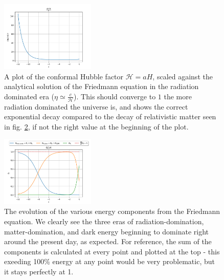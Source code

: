 \begin{figure}[h!tbp]
\centering
\includegraphics[width=0.4\textwidth]{../Milestone 1/Plots/etaHp_over_c_of_x.png}
\caption{A plot of the conformal Hubble factor $\mathcal{H} = aH$, scaled against the analytical solution of the Friedmann equation in the radiation dominated era ($\eta \simeq \frac{c}{\mathcal{H}}$). This should converge to $1$ the more radiation dominated the universe is, and shows the correct exponential decay compared to the decay of relativistic matter seen in fig. \ref{fig:milestone_1_Omega_i_of_x}, if not the right value at the beginning of the plot.}
\label{fig:milestone_1_etaHp_over_c_of_x}
\end{figure}

\begin{figure}[h!tbp]
\centering
\includegraphics[width=0.4\textwidth]{../Milestone 1/Plots/Omega_i_of_x.png}
\caption{The evolution of the various energy components from the Friedmann equation. We clearly see the three eras of radiation-domination, matter-domination, and dark energy beginning to dominate right around the present day, as expected. For reference, the sum of the components is calculated at every point and plotted at the top - this exeeding 100\% energy at any point would be very problematic, but it stays perfectly at 1.}
\label{fig:milestone_1_Omega_i_of_x}
\end{figure}

